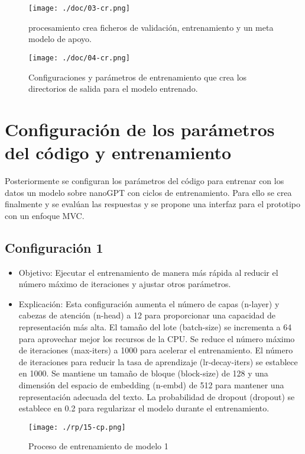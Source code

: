 \begin{figure}[H]
   \centering %
       \texttt{[image: ./doc/03-cr.png]} 
   \caption{procesamiento crea  ficheros de validación, entrenamiento y un meta modelo de apoyo.  \cite{}}
  \label{figure:Resultado 1}  %
\end{figure}
\begin{figure}[H]
   \centering %
       \texttt{[image: ./doc/04-cr.png]} 
   \caption{Configuraciones y parámetros de entrenamiento que crea los directorios de salida para el modelo entrenado.  \cite{}}
  \label{figure:Resultado 1}  %
\end{figure}
\section{Configuración de los parámetros del código y entrenamiento}\label{section:Configuración de los parámetros del código} 
Posteriormente se configuran los parámetros del código para entrenar con los datos un modelo sobre nanoGPT con ciclos de entrenamiento. Para ello se crea finalmente y se evalúan las respuestas y se propone una interfaz para el prototipo con un enfoque MVC.
\subsection{Configuración 1}\label{section:Configuración de los parámetros del código} 
\begin{itemize}
        \item   Objetivo: Ejecutar el entrenamiento de manera más rápida al reducir el número máximo de iteraciones y ajustar otros parámetros.
        \item   Explicación: Esta configuración aumenta el número de capas (n-layer) y cabezas de atención (n-head) a 12 para proporcionar una capacidad de representación más alta. El tamaño del lote (batch-size) se incrementa a 64 para aprovechar mejor los recursos de la CPU. Se reduce el número máximo de iteraciones (max-iters) a 1000 para acelerar el entrenamiento. El número de iteraciones para reducir la tasa de aprendizaje (lr-decay-iters) se establece en 1000. Se mantiene un tamaño de bloque (block-size) de 128 y una dimensión del espacio de embedding (n-embd) de 512 para mantener una representación adecuada del texto. La probabilidad de dropout (dropout) se establece en 0.2 para regularizar el modelo durante el entrenamiento.
    \end{itemize}
    \begin{figure}[H]
   \centering %
       \texttt{[image: ./rp/15-cp.png]} 
   \caption{Proceso de entrenamiento de modelo 1\cite{}}
  \label{figure:Resultado 1}  %
\end{figure}
